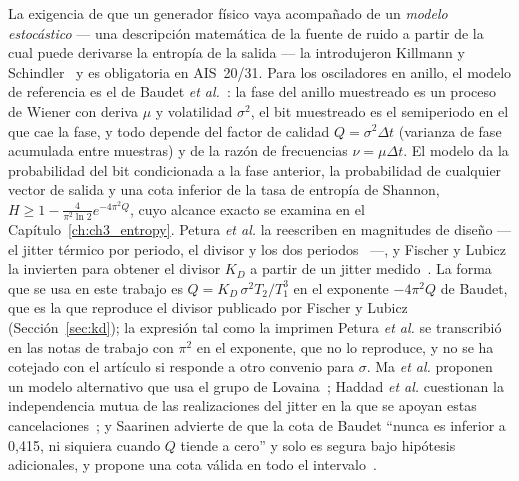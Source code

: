 La exigencia de que un generador físico vaya acompañado de un
\emph{modelo estocástico} --- una descripción matemática de la fuente de
ruido a partir de la cual puede derivarse la entropía de la salida --- la
introdujeron Killmann y Schindler~\cite{killmann_2008_design, schindler_2002_evaluation}
y es obligatoria en AIS~20/31. Para los osciladores en anillo, el modelo
de referencia es el de Baudet \emph{et al.}~\cite{baudet_2011_security}:
la fase del anillo muestreado es un proceso de Wiener con deriva $\mu$ y
volatilidad $\sigma^2$, el bit muestreado es el semiperiodo en el que cae
la fase, y todo depende del factor de calidad $Q=\sigma^2\Delta t$
(varianza de fase acumulada entre muestras) y de la razón de frecuencias
$\nu=\mu\Delta t$. El modelo da la probabilidad del bit condicionada a la
fase anterior, la probabilidad de cualquier vector de salida y una cota
inferior de la tasa de entropía de Shannon,
$H \ge 1 - \frac{4}{\pi^2\ln 2}e^{-4\pi^2 Q}$, cuyo alcance exacto se
examina en el Capítulo~\ref{ch:ch3_entropy}. Petura \emph{et al.} la
reescriben en magnitudes de diseño --- el jitter térmico por periodo, el
divisor y los dos periodos~\cite{petura_2016_survey} ---, y Fischer y
Lubicz la invierten para obtener
el divisor $K_D$ a partir de un jitter medido~\cite{fischer_2014_embedded}.
La forma que se usa en este trabajo es $Q = K_D\,\sigma^2 T_2/T_1^3$ en
el exponente $-4\pi^2 Q$ de Baudet, que es la que reproduce el divisor
publicado por Fischer y Lubicz (Sección~\ref{sec:kd}); la expresión tal
como la imprimen Petura \emph{et al.} se transcribió en las notas de
trabajo con $\pi^2$ en el exponente, que no lo reproduce, y no se ha
cotejado con el artículo si responde a otro convenio para $\sigma$.
Ma \emph{et al.} proponen un modelo alternativo que usa el grupo de
Lovaina~\cite{ma_2014_entropy}; Haddad \emph{et al.} cuestionan la
independencia mutua de las realizaciones del jitter en la que se apoyan
estas cancelaciones~\cite{haddad_2014_assumption}; y Saarinen advierte de
que la cota de Baudet ``nunca es inferior a 0,415, ni siquiera cuando $Q$
tiende a cero'' y solo es segura bajo hipótesis adicionales, y propone
una cota válida en todo el intervalo~\cite{saarinen_2021_entropy}.

